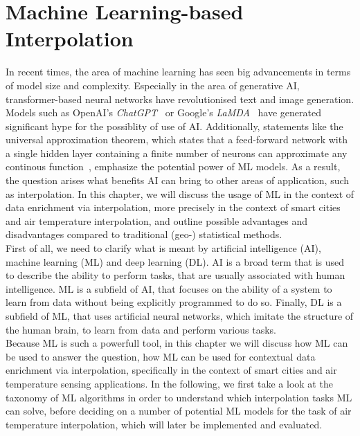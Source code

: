 \chapter{Machine Learning-based Interpolation}
\label{chap:Machine Learning based Interpolation}

In recent times, the area of machine learning has seen big advancements in terms of model size and complexity. Especially in the area of generative AI, transformer-based neural networks have revolutionised text and image generation. Models such as OpenAI's \textit{ChatGPT}~\cite{openai2023gpt4} or Google's \textit{LaMDA}~\cite{thoppilan2022lamda} have generated significant hype for the possiblity of use of AI\@. Additionally, statements like the universal approximation theorem, which states that a feed-forward network with a single hidden layer containing a finite number of neurons can approximate any continous function~\cite{hornik1989multilayer}, emphasize the potential power of ML models.
As a result, the question arises what benefits AI can bring to other areas of application, such as interpolation. In this chapter, we will discuss the usage of ML in the context of data enrichment via interpolation, more precisely in the context of smart cities and air temperature interpolation, and outline possible advantages and disadvantages compared to traditional (geo-) statistical methods.\\
First of all, we need to clarify what is meant by artificial intelligence (AI), machine learning (ML) and deep learning (DL). AI is a broad term that is used to describe the ability to perform tasks, that are usually associated with human intelligence. ML is a subfield of AI, that focuses on the ability of a system to learn from data without being explicitly programmed to do so. Finally, DL is a subfield of ML, that uses artificial neural networks, which imitate the structure of the human brain, to learn from data and perform various tasks.\\
Because ML is such a powerfull tool, in this chapter we will discuss how ML can be used to answer the question, how ML can be used for contextual data enrichment via interpolation, specifically in the context of smart cities and air temperature sensing applications. In the following, we first take a look at the taxonomy of ML algorithms in order to understand which interpolation tasks ML can solve, before deciding on a number of potential ML models for the task of air temperature interpolation, which will later be implemented and evaluated.

